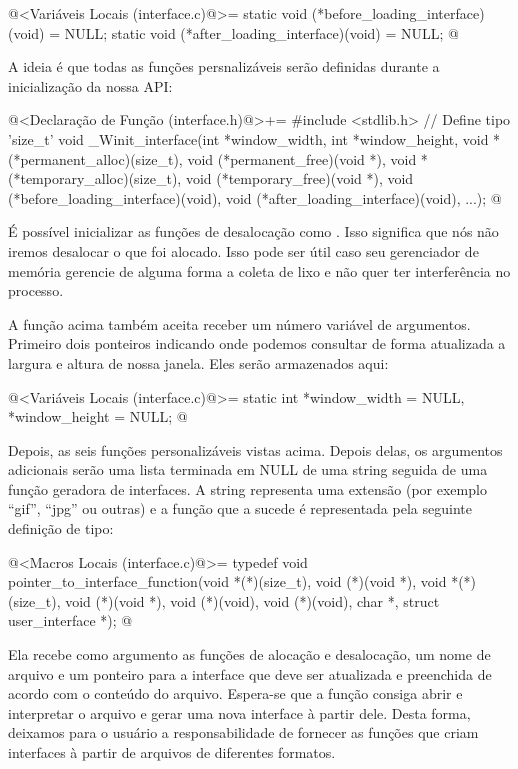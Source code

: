\iniciocodigo
@<Variáveis Locais (interface.c)@>=
static void (*before_loading_interface)(void) = NULL;
static void (*after_loading_interface)(void) = NULL;
@
\fimcodigo

A ideia é que todas as funções persnalizáveis serão definidas durante
a inicialização da nossa API:

\iniciocodigo
@<Declaração de Função (interface.h)@>+=
#include <stdlib.h> // Define tipo 'size_t'
void _Winit_interface(int *window_width, int *window_height,
                      void *(*permanent_alloc)(size_t),
                      void (*permanent_free)(void *),
                      void *(*temporary_alloc)(size_t),
                      void (*temporary_free)(void *),
                      void (*before_loading_interface)(void),
                      void (*after_loading_interface)(void),
                      ...);
@
\fimcodigo


É possível inicializar as funções de desalocação como
. Isso significa que nós não iremos desalocar o que
foi alocado. Isso pode ser útil caso seu gerenciador de memória
gerencie de alguma forma a coleta de lixo e não quer ter interferência
no processo.

A função acima também aceita receber um número variável de
argumentos. Primeiro dois ponteiros indicando onde podemos consultar
de forma atualizada a largura e altura de nossa janela. Eles serão
armazenados aqui:

\iniciocodigo
@<Variáveis Locais (interface.c)@>=
static int *window_width = NULL, *window_height = NULL;
@
\fimcodigo

Depois, as seis funções personalizáveis vistas acima. Depois delas, os
argumentos adicionais serão uma lista terminada em NULL de uma string
seguida de uma função geradora de interfaces. A string representa uma
extensão (por exemplo ``gif'', ``jpg'' ou outras) e a função que a
sucede é representada pela seguinte definição de tipo:

\iniciocodigo
@<Macros Locais (interface.c)@>=
typedef void pointer_to_interface_function(void *(*)(size_t), void (*)(void *),
                                          void *(*)(size_t), void (*)(void *),
                                          void (*)(void), void (*)(void),
                                          char *, struct user_interface *);
@
\fimcodigo

Ela recebe como argumento as funções de alocação e desalocação, um
nome de arquivo e um ponteiro para a interface que deve ser atualizada
e preenchida de acordo com o conteúdo do arquivo. Espera-se que a
função consiga abrir e interpretar o arquivo e gerar uma nova
interface à partir dele.  Desta forma, deixamos para o usuário a
responsabilidade de fornecer as funções que criam interfaces à partir
de arquivos de diferentes formatos.

